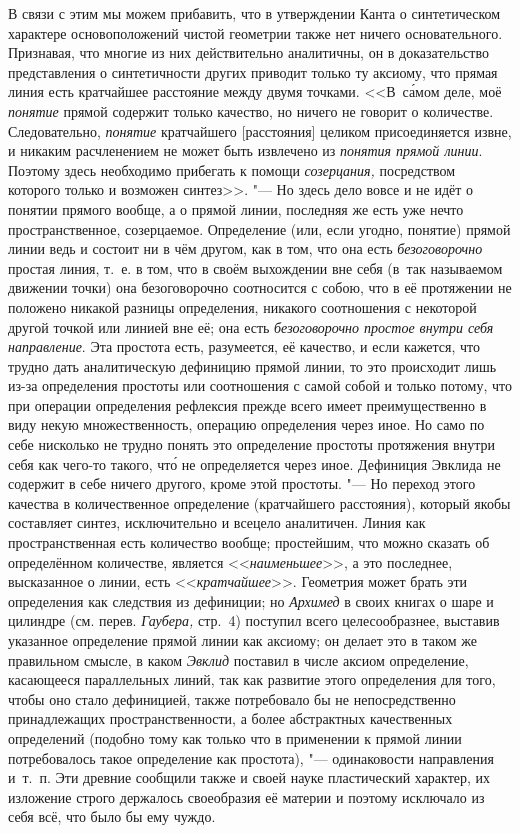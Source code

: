 В связи с этим мы можем прибавить, что в утверждении Канта о синтетическом
характере основоположений чистой геометрии также нет ничего основательного.
Признавая, что многие из них действительно аналитичны, он в доказательство
представления о синтетичности других приводит только ту аксиому, что прямая
линия есть кратчайшее расстояние между двумя точками. <<В~с\'{а}мом деле, моё
{\em понятие} прямой содержит только качество, но ничего не говорит
о количестве. Следовательно, {\em понятие} кратчайшего [расстояния]
целиком присоединяется извне, и никаким расчленением не может быть извлечено
из {\em понятия прямой линии}. Поэтому здесь необходимо прибегать
к помощи {\em созерцания,} посредством которого только и возможен
синтез>>. "--- Но здесь дело вовсе и не идёт о понятии прямого вообще, а о
прямой линии, последняя же есть уже нечто пространственное, созерцаемое.
Определение (или, если угодно, понятие) прямой линии ведь и состоит ни в чём
другом, как в том, что она есть {\em безоговорочно} простая линия, т.~е. в том,
что в своём выхождении вне себя (в~так называемом движении точки) она
безоговорочно соотносится с собою, что в её протяжении не положено никакой
разницы определения, никакого соотношения с некоторой другой точкой или линией
вне её; она есть {\em безоговорочно простое внутри себя направление}. Эта
простота есть, разумеется, её качество, и если кажется, что трудно дать
аналитическую дефиницию прямой линии, то это происходит лишь из-за определения
простоты или соотношения с самой собой и только потому, что при операции
определения рефлексия прежде всего имеет преимущественно в виду некую
множественность, операцию определения через иное. Но само по себе нисколько
не трудно понять это определение простоты протяжения внутри себя как чего-то
такого, чт\'{о} не определяется через иное. Дефиниция Эвклида не содержит в себе ничего
другого, кроме этой простоты. "--- Но переход этого качества в количественное
определение (кратчайшего расстояния), который якобы составляет синтез,
исключительно и всецело аналитичен. Линия как пространственная есть количество
вообще; простейшим, что можно сказать об определённом количестве, является
<<{\em наименьшее}>>, а это последнее, высказанное о линии, есть
<<{\em кратчайшее}>>. Геометрия может брать эти определения как следствия из
дефиниции; но {\em Архимед} в своих книгах о шаре и цилиндре (см. перев.
{\em Гаубера,} стр.~4) поступил всего целесообразнее, выставив указанное
определение прямой линии как аксиому; он делает это в таком же правильном
смысле, в каком {\em Эвклид} поставил в числе аксиом определение, касающееся
параллельных линий, так как развитие этого определения для того, чтобы оно
стало дефиницией, также потребовало бы не непосредственно принадлежащих
пространственности, а более абстрактных качественных определений (подобно тому
как только что в применении к прямой линии потребовалось такое определение как
простота), "--- одинаковости направления и~т.~п. Эти древние сообщили также и
своей науке пластический характер, их изложение строго держалось своеобразия её
материи и поэтому исключало из себя всё, что было бы ему чуждо.

